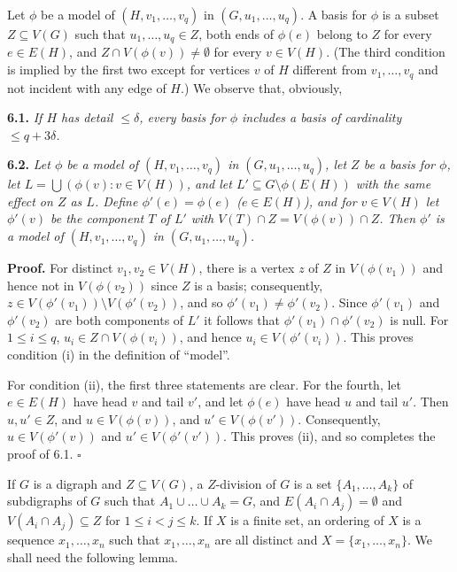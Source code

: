 Let $\phi$ be a model of $(H, v_1, \ldots, v_q)$ in $(G, u_1, \ldots, u_q)$. A basis for $\phi$ is a subset $Z \subseteq V(G)$ such that $u_1, \ldots, u_q \in Z$, both ends of $\phi(e)$ belong to $Z$ for every $e \in E(H)$, and $Z \cap V(\phi(v)) \ne \emptyset$ for every $v \in V(H)$. (The third condition is implied by the first two except for vertices $v$ of $H$ different from $v_1, \ldots, v_q$ and not incident with any edge of $H$.) We observe that, obviously,

\textbf{6.1.} \textit{If $H$ has detail $\le \delta$, every basis for $\phi$ includes a basis of cardinality $\le q + 3\delta$.}

\textbf{6.2.} \textit{Let $\phi$ be a model of $(H, v_1, \ldots, v_q)$ in $(G, u_1, \ldots, u_q)$, let $Z$ be a basis for $\phi$, let $L = \bigcup(\phi(v) : v \in V(H))$, and let $L' \subseteq G \setminus \phi(E(H))$ with the same effect on $Z$ as $L$. Define $\phi'(e) = \phi(e)$ ($e \in E(H)$), and for $v \in V(H)$ let $\phi'(v)$ be the component $T$ of $L'$ with $V(T) \cap Z = V(\phi(v)) \cap Z$. Then $\phi'$ is a model of $(H, v_1, \ldots, v_q)$ in $(G, u_1, \ldots, u_q)$.}

\textbf{Proof.} For distinct $v_1, v_2 \in V(H)$, there is a vertex $z$ of $Z$ in $V(\phi(v_1))$ and hence not in $V(\phi(v_2))$ since $Z$ is a basis; consequently, $z \in V(\phi'(v_1)) \setminus V(\phi'(v_2))$, and so $\phi'(v_1) \ne \phi'(v_2)$. Since $\phi'(v_1)$ and $\phi'(v_2)$ are both components of $L'$ it follows that $\phi'(v_1) \cap \phi'(v_2)$ is null. For $1 \le i \le q$, $u_i \in Z \cap V(\phi(v_i))$, and hence $u_i \in V(\phi'(v_i))$. This proves condition (i) in the definition of ``model''.

For condition (ii), the first three statements are clear. For the fourth, let $e \in E(H)$ have head $v$ and tail $v'$, and let $\phi(e)$ have head $u$ and tail $u'$. Then $u, u' \in Z$, and $u \in V(\phi(v))$, and $u' \in V(\phi(v'))$. Consequently, $u \in V(\phi'(v))$ and $u' \in V(\phi'(v'))$. This proves (ii), and so completes the proof of 6.1. $\square$

If $G$ is a digraph and $Z \subseteq V(G)$, a $Z$-division of $G$ is a set $\{A_1, \ldots, A_k\}$ of subdigraphs of $G$ such that $A_1 \cup \dots \cup A_k = G$, and $E(A_i \cap A_j) = \emptyset$ and $V(A_i \cap A_j) \subseteq Z$ for $1 \le i < j \le k$. If $X$ is a finite set, an ordering of $X$ is a sequence $x_1, \ldots, x_n$ such that $x_1, \ldots, x_n$ are all distinct and $X = \{x_1, \ldots, x_n\}$. We shall need the following lemma.
